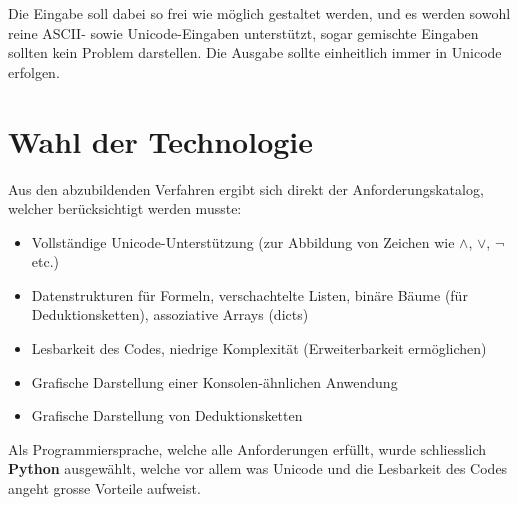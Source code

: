 \documentclass[11pt,a4paper,ngerman]{scrreprt}
\begin{document}
Die Eingabe soll dabei so frei wie möglich gestaltet werden, und es werden sowohl reine ASCII- sowie Unicode-Eingaben unterstützt, sogar gemischte Eingaben sollten kein Problem darstellen. Die Ausgabe sollte einheitlich immer in Unicode erfolgen.

\section{Wahl der Technologie}
Aus den abzubildenden Verfahren ergibt sich direkt der Anforderungskatalog, welcher berücksichtigt werden musste:
\begin{itemize}
 \item Vollständige Unicode-Unterstützung (zur Abbildung von Zeichen wie $\wedge$, $\vee$, $\neg$ etc.)
 \item Datenstrukturen für Formeln, verschachtelte Listen, binäre Bäume (für Deduktionsketten), assoziative Arrays (dicts)
 \item Lesbarkeit des Codes, niedrige Komplexität (Erweiterbarkeit ermöglichen)
 \item Grafische Darstellung einer Konsolen-ähnlichen Anwendung
 \item Grafische Darstellung von Deduktionsketten
\end{itemize}
Als Programmiersprache, welche alle Anforderungen erfüllt, wurde schliesslich \textbf{Python} ausgewählt, welche vor allem was Unicode und die Lesbarkeit des Codes angeht grosse Vorteile aufweist.
\end{document}
